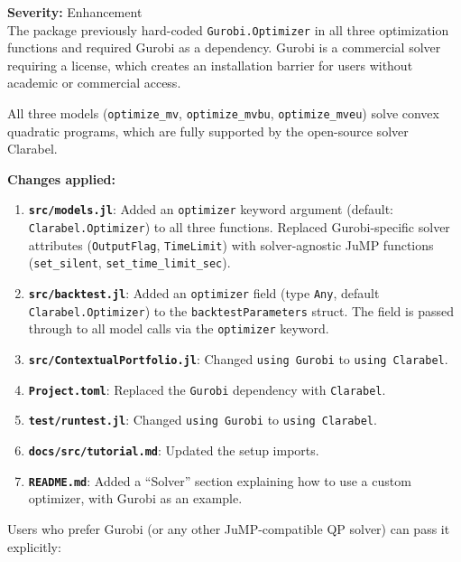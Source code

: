\documentclass[11pt,a4paper]{article}
\begin{document}
\textbf{Severity:} Enhancement\\[0.3em]
The package previously hard-coded \texttt{Gurobi.Optimizer} in all three
optimization functions and required Gurobi as a dependency. Gurobi is a
commercial solver requiring a license, which creates an installation barrier
for users without academic or commercial access.

All three models (\texttt{optimize\_mv}, \texttt{optimize\_mvbu},
\texttt{optimize\_mveu}) solve convex quadratic programs, which are fully
supported by the open-source solver Clarabel.

\textbf{Changes applied:}

\begin{enumerate}
  \item \textbf{\texttt{src/models.jl}}: Added an \texttt{optimizer} keyword
    argument (default: \texttt{Clarabel.Optimizer}) to all three functions.
    Replaced Gurobi-specific solver attributes (\texttt{OutputFlag},
    \texttt{TimeLimit}) with solver-agnostic JuMP functions
    (\texttt{set\_silent}, \texttt{set\_time\_limit\_sec}).

  \item \textbf{\texttt{src/backtest.jl}}: Added an \texttt{optimizer} field
    (type \texttt{Any}, default \texttt{Clarabel.Optimizer}) to the
    \texttt{backtestParameters} struct. The field is passed through to all
    model calls via the \texttt{optimizer} keyword.

  \item \textbf{\texttt{src/ContextualPortfolio.jl}}: Changed
    \texttt{using Gurobi} to \texttt{using Clarabel}.

  \item \textbf{\texttt{Project.toml}}: Replaced the \texttt{Gurobi}
    dependency with \texttt{Clarabel}.

  \item \textbf{\texttt{test/runtest.jl}}: Changed \texttt{using Gurobi} to
    \texttt{using Clarabel}.

  \item \textbf{\texttt{docs/src/tutorial.md}}: Updated the setup imports.

  \item \textbf{\texttt{README.md}}: Added a ``Solver'' section explaining
    how to use a custom optimizer, with Gurobi as an example.
\end{enumerate}

Users who prefer Gurobi (or any other JuMP-compatible QP solver) can pass it
explicitly:
\end{document}
